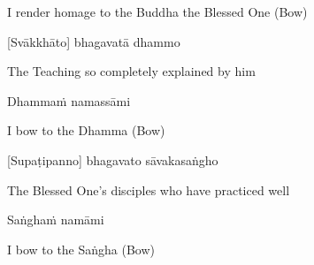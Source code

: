 \begin{cprenglish}
  I render homage to the Buddha the Blessed One \hfill{(Bow)}
\end{cprenglish}

[Svākkhāto] bhagavatā dhammo

\begin{cprenglish}
  The Teaching so completely explained by him
\end{cprenglish}

Dhammaṁ namassāmi

\begin{cprenglish}
  I bow to the Dhamma \hfill{(Bow)}
\end{cprenglish}

[Supaṭipanno] bhagavato sāvakasaṅgho

\begin{cprenglish}
  The Blessed One’s disciples who have practiced well
\end{cprenglish}

Saṅghaṁ namāmi

\begin{cprenglish}
  I bow to the Saṅgha \hfill{(Bow)}
\end{cprenglish}

